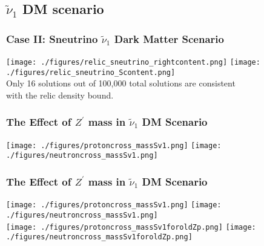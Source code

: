 \documentclass[hyperref={bookmarks=false},aspectratio=169]{beamer}
\begin{document}










\subsection{$\widetilde{\nu}_1$ DM  scenario}


\begin{frame}
\frametitle{Case II: Sneutrino $\widetilde{\nu}_1$ Dark Matter Scenario}
\centering
\texttt{[image: ./figures/relic\_sneutrino\_rightcontent.png]} 
\texttt{[image: ./figures/relic\_sneutrino\_Scontent.png]} \\

Only 16 solutions out of 100,000 total solutions are consistent \\
with the relic density bound.

\end{frame}







\begin{frame}
\frametitle{The Effect of $Z^{\prime}$ mass in $\widetilde{\nu}_1$ DM Scenario}
\centering
\texttt{[image: ./figures/protoncross\_massSv1.png]} 
\texttt{[image: ./figures/neutroncross\_massSv1.png]} \\


\end{frame}




\begin{frame}
\frametitle{The Effect of $Z^{\prime}$ mass in $\widetilde{\nu}_1$ DM Scenario}
\centering
\texttt{[image: ./figures/protoncross\_massSv1.png]} 
\texttt{[image: ./figures/neutroncross\_massSv1.png]} \\

	
	\centering
	\texttt{[image: ./figures/protoncross\_massSv1foroldZp.png]} 
	\texttt{[image: ./figures/neutroncross\_massSv1foroldZp.png]} \\	


\end{frame}
\end{document}
